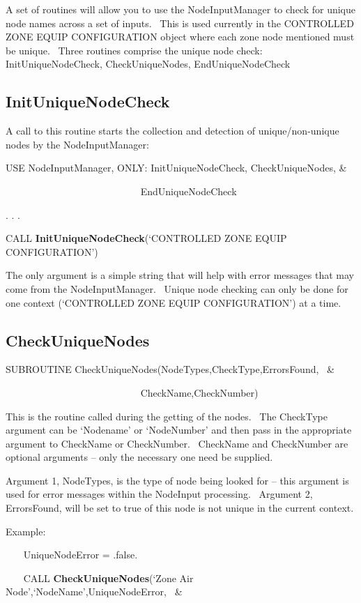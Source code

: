 A set of routines will allow you to use the NodeInputManager to check for unique node names across a set of inputs.~ This is used currently in the CONTROLLED ZONE EQUIP CONFIGURATION object where each zone node mentioned must be unique.~ Three routines comprise the unique node check:~ InitUniqueNodeCheck, CheckUniqueNodes, EndUniqueNodeCheck

\subsection{InitUniqueNodeCheck}\label{inituniquenodecheck}

A call to this routine starts the collection and detection of unique/non-unique nodes by the NodeInputManager:

USE NodeInputManager, ONLY: InitUniqueNodeCheck, CheckUniqueNodes, \&

~~~~~~~~~~~~~~~~~~~~~~~~~~~ EndUniqueNodeCheck

. . .

CALL \textbf{InitUniqueNodeCheck}(`CONTROLLED ZONE EQUIP CONFIGURATION')

The only argument is a simple string that will help with error messages that may come from the NodeInputManager.~ Unique node checking can only be done for one context (`CONTROLLED ZONE EQUIP CONFIGURATION') at a time.

\subsection{CheckUniqueNodes}\label{checkuniquenodes}

SUBROUTINE CheckUniqueNodes(NodeTypes,CheckType,ErrorsFound,~ \&

~~~~~~~~~~~~~~~~~~~~~~~~~~~ CheckName,CheckNumber)

This is the routine called during the getting of the nodes.~ The CheckType argument can be `Nodename' or `NodeNumber' and then pass in the appropriate argument to CheckName or CheckNumber.~ CheckName and CheckNumber are optional arguments -- only the necessary one need be supplied.

Argument 1, NodeTypes, is the type of node being looked for -- this argument is used for error messages within the NodeInput processing.~ Argument 2, ErrorsFound, will be set to true of this node is not unique in the current context.

Example:

~~~ UniqueNodeError = .false.

~~~ CALL \textbf{CheckUniqueNodes}(`Zone Air Node',`NodeName',UniqueNodeError,~ \&

